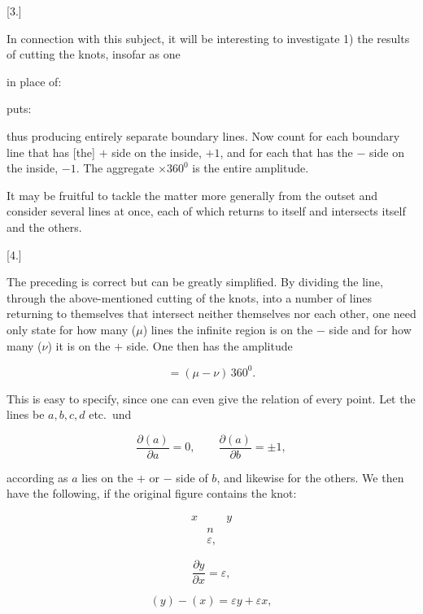 %
\begin{center}[3.]\end{center}

In connection with this subject, it will be interesting to
investigate 1) the results of cutting the knots, insofar as
one

\begin{center}
\begin{minipage}{5.7cm}\centering in place of:\quad\end{minipage}
\begin{minipage}{5.7cm}\centering puts:\quad\end{minipage}
\end{center}
\noindent thus producing entirely separate boundary lines. Now count
for each boundary line that has [the] $+$ side on the inside, $+1$, and for
each that has the $-$ side on the inside, $-1$. The aggregate $\times 360^0$
is the entire amplitude.

It may be fruitful to tackle the matter more generally from the
outset and consider several lines at once, each of which returns
to itself and intersects itself and the
others.

\begin{center}[4.]\end{center}

The preceding is correct but can be greatly simplified. By
dividing the line, through the above-mentioned cutting of the knots, into a number of
lines returning to themselves that intersect neither themselves nor each other,
one need only state for how many ($\mu$) lines the
infinite region is on the $-$ side and for how many ($\nu$) it is on the
$+$ side. One then has the amplitude

\[
= (\mu-\nu)\,360^0.
\]

This is easy to specify, since one can even give the relation of every point.
Let the lines be $a, b, c, d$
etc.\ und

\[
\frac{\partial(a)}{\partial a} = 0, \qquad \frac{\partial(a)}{\partial b} = \pm 1,
\]

according as $a$ lies on the $+$ or $-$ side of $b$, and likewise for the
others. We then have the following, if the original figure contains the
knot:

\[
\begin{array}{ccc}
x&&y \\
&n& \\
&\varepsilon,&
\end{array}
\]

\[
\frac{\partial y}{\partial x} = \varepsilon,
\]

\[
(y) - (x) = \varepsilon y + \varepsilon x,
\]
